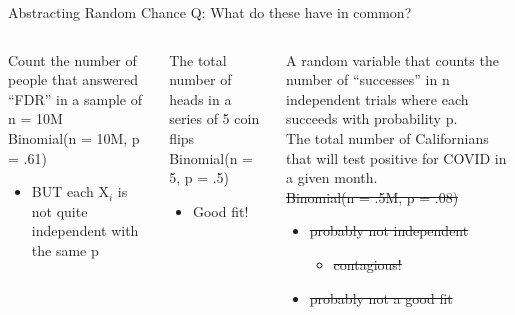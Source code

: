 \documentclass[aspectratio=169]{../latex_main/tntbeamer}  %
\begin{document}
	
	\begin{frame}[c]{Abstracting Random Chance}
	    Q: What do these have in common?\\
	    \bigskip
	    \begin{columns}
	        \begin{column}{.3\textwidth}
	            Count the number of people that answered “FDR” in a sample of n = 10M\\
	            \bigskip
	            Binomial(n = 10M, p = .61)
	            \begin{itemize}
	                \item BUT each X$_i$ is not quite independent with the same p

	            \end{itemize}
	        \end{column}
	        
	        \begin{column}{.3\textwidth}
	          The total number of heads in a series of 5 coin flips\\
	          \bigskip
	          Binomial(n = 5, p = .5)
	          \begin{itemize}
	              \item Good fit!
	          \end{itemize}

	        \end{column}
	        
	        \begin{column}{.4\textwidth}
	          A random variable that counts the number of “successes” in n independent trials where each succeeds with probability p.\\
	          \bigskip
	          The total number of Californians that will test positive for COVID in a given month.\\
              \sout{Binomial(n = .5M, p = .08)}
              \begin{itemize}
                  \item \sout{probably not independent}
                  \begin{itemize}
                  \item \sout{contagious!}
                  \end{itemize}
                  \item \sout{probably not a good fit}
              \end{itemize}


	        \end{column}
	    \end{columns}
	\end{frame}
	
\end{document}

